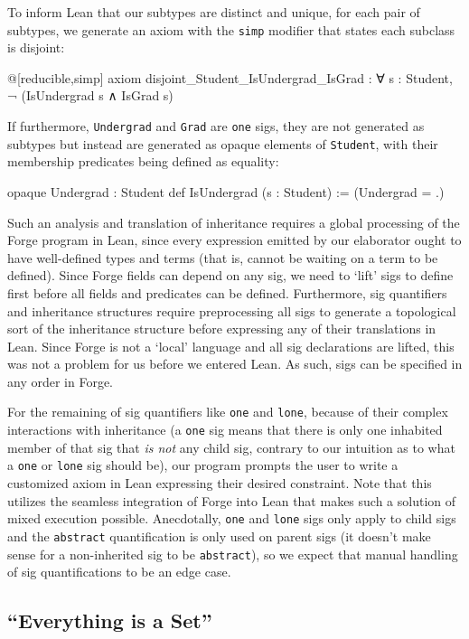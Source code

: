 To inform Lean that our subtypes are distinct and unique, for each pair of subtypes, we generate an axiom with the \texttt{simp} modifier that states each subclass is disjoint: 
\begin{lean*}
@[reducible,simp] axiom disjoint_Student_IsUndergrad_IsGrad : 
  ∀ s : Student, ¬ (IsUndergrad s ∧ IsGrad s)
\end{lean*}  

If furthermore, \texttt{Undergrad} and \texttt{Grad} are \texttt{one} sigs, they are not generated as subtypes but instead are generated as opaque elements of \texttt{Student}, with their membership predicates being defined as equality: 
\begin{lean*}
opaque Undergrad : Student
def IsUndergrad (s : Student) := (Undergrad = .)
\end{lean*}

Such an analysis and translation of inheritance requires a global processing of the Forge program in Lean, since every expression emitted by our elaborator ought to have well-defined types and terms (that is, cannot be waiting on a term to be defined). Since Forge fields can depend on any sig, we need to `lift' sigs to define first before all fields and predicates can be defined. Furthermore, sig quantifiers and inheritance structures require preprocessing all sigs to generate a topological sort of the inheritance structure before expressing any of their translations in Lean. Since Forge is not a `local' language and all sig declarations are lifted, this was not a problem for us before we entered Lean. As such, sigs can be specified in any order in Forge. 

For the remaining of sig quantifiers like \texttt{one} and \texttt{lone}, because of their complex interactions with inheritance (a \texttt{one} sig means that there is only one inhabited member of that sig that \emph{is not} any child sig, contrary to our intuition as to what a \texttt{one} or \texttt{lone} sig should be), our program prompts the user to write a customized axiom in Lean expressing their desired constraint. Note that this utilizes the seamless integration of Forge into Lean that makes such a solution of mixed execution possible. Anecdotally, \texttt{one} and \texttt{lone} sigs only apply to child sigs and the \texttt{abstract} quantification is only used on parent sigs (it doesn't make sense for a non-inherited sig to be \texttt{abstract}), so we expect that manual handling of sig quantifications to be an edge case. 

\subsection{``Everything is a Set''}\label{sec:everything-is-a-set}
